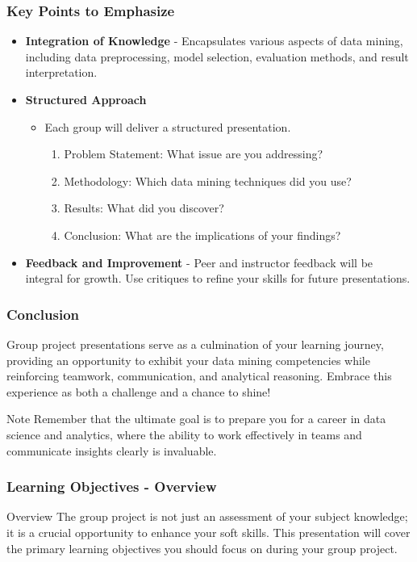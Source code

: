 \documentclass{beamer}
\begin{document}
\begin{frame}[fragile]
    \frametitle{Key Points to Emphasize}
    \begin{itemize}
        \item \textbf{Integration of Knowledge}
            - Encapsulates various aspects of data mining, including data preprocessing, model selection, evaluation methods, and result interpretation.
        
        \item \textbf{Structured Approach}
        \begin{itemize}
            \item Each group will deliver a structured presentation.
            \begin{enumerate}
                \item Problem Statement: What issue are you addressing?
                \item Methodology: Which data mining techniques did you use?
                \item Results: What did you discover?
                \item Conclusion: What are the implications of your findings?
            \end{enumerate}
        \end{itemize}

        \item \textbf{Feedback and Improvement}
            - Peer and instructor feedback will be integral for growth. Use critiques to refine your skills for future presentations.
    \end{itemize}
\end{frame}

\begin{frame}[fragile]
    \frametitle{Conclusion}
    Group project presentations serve as a culmination of your learning journey, providing an opportunity to exhibit your data mining competencies while reinforcing teamwork, communication, and analytical reasoning. Embrace this experience as both a challenge and a chance to shine!
    
    \begin{block}{Note}
        Remember that the ultimate goal is to prepare you for a career in data science and analytics, where the ability to work effectively in teams and communicate insights clearly is invaluable.
    \end{block}
\end{frame}

\begin{frame}[fragile]
    \frametitle{Learning Objectives - Overview}
    \begin{block}{Overview}
        The group project is not just an assessment of your subject knowledge; 
        it is a crucial opportunity to enhance your soft skills. This presentation 
        will cover the primary learning objectives you should focus on during your group project.
    \end{block}
\end{frame}
\end{document}
